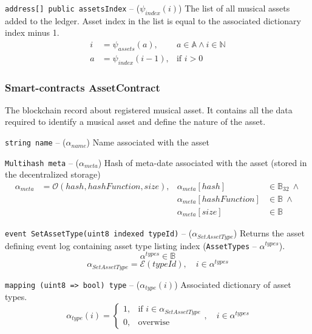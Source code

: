 \documentclass[12pt]{report}
\newcommand{\hlc}[1]{\colorbox{yellow!25}{#1}}
\def\code#1{\colorbox{light-gray}{\texttt{#1}}}
\begin{document}
\code{address[] public assetsIndex} – ($\psi_{index}(i)$)\hfill\null\linebreak
The list of all musical assets added to the ledger. Asset index in the list is equal to the associated dictionary index minus 1.
\begin{align}
i &= \psi_{assets}(a), &a \in \mathbb{A} \wedge i \in \mathbb{N} \\
a &= \psi_{index}(i - 1), &\text{if } i > 0
\end{align}

\subsubsection{Smart-contracts AssetContract}
\label{tech-apps-assets-contract}
The blockchain record about registered musical asset. It contains all the data required to identify a musical asset and define the nature of the asset.

\code{string name} – ($\alpha_{name}$)\hfill\null\linebreak
Name associated with the asset

\code{Multihash meta} – ($\alpha_{meta}$)\hfill\null\linebreak
Hash \hlc{of} meta-date associated with the asset (stored in the decentralized storage)
\begin{align}
\alpha_{meta} &= \mathcal{O}(hash, hashFunction, size), &\alpha_{meta}[hash] &\in \mathbb{B}_{32} \ \wedge \\ 
&&\alpha_{meta}[hashFunction] &\in \mathbb{B} \ \wedge \\
&& \alpha_{meta}[size] &\in \mathbb{B}
\end{align}

\code{event SetAssetType(uint8 indexed typeId)} – ($\alpha_{SetAssetType}$)\hfill\null\linebreak
Returns the asset defining event log containing asset type listing index (\code{AssetTypes} – $\alpha^{types}$).
\begin{equation}
\alpha^{types} \in \mathbb{B}
\end{equation}
\begin{equation}
\alpha_{SetAssetType} = \mathcal{E}(typeId), \quad i \in \alpha^{types}
\end{equation}

\code{mapping (uint8 => bool) type} – ($\alpha_{type}(i)$)\hfill\null\linebreak
Associated dictionary of asset types.
\begin{equation}
\alpha_{type}(i) = \begin{cases}
1, & \text{if } i \in \alpha_{SetAssetType} \\
0, & \text{overwise}
\end{cases}, \quad i \in \alpha^{types}
\end{equation}
\end{document}
